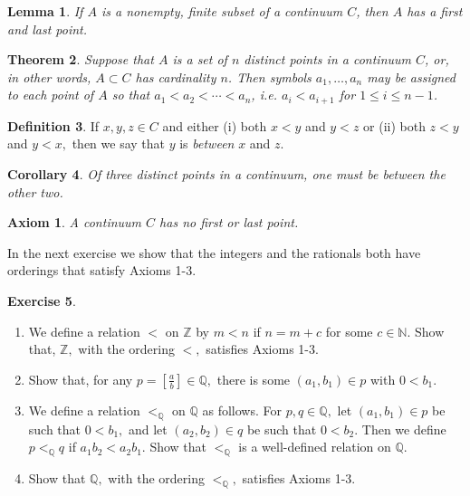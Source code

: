 \documentclass[11pt]{article}
\newcommand{\bbN}{\mathbb{N}}
\newcommand{\bbQ}{\mathbb{Q}}
\newcommand{\bbZ}{\mathbb{Z}}
\renewcommand{\_}[1]{\underline{ #1 }}
\newtheorem{theorem}{Theorem}[section]
\newtheorem{lemma}[theorem]{Lemma}
\newtheorem{corollary}[theorem]{Corollary}
\newtheorem{axiom}{Axiom}
\theoremstyle{definition}
\newtheorem{definition}[theorem]{Definition}
\newtheorem{exercise}[theorem]{Exercise}
\numberwithin{equation}{subsection}
\begin{document}
\begin{lemma}  If $A$ is a nonempty, finite subset of a continuum $C$, then $A$ has a first and last point.
\end{lemma}

\begin{theorem}  Suppose that $A$ is a set of $n$ distinct points in a continuum $C$, or, in other words, $A \subset C$ has cardinality $n$.  Then symbols $a_1, \dotsc, a_n$ may be assigned to each point of $A$ so that $a_1 < a_2 < \dotsm < a_n$, i.e. $a_i < a_{i + 1}$ for $1 \leq i \leq n - 1$.
\end{theorem}

\begin{definition}  If $x, y, z \in C$ and either (i) both $x < y$ and $y < z$ or (ii) both $z<y$ and $y<x,$ then we say that $y$ is \emph{between} $x$ and $z$.
\end{definition}

\begin{corollary}  Of three distinct points in a continuum, one must be between the other two.
\end{corollary}

\begin{axiom} A continuum $C$ has no first or last point.
\end{axiom}


In the next exercise we show that the integers and the rationals both have orderings that satisfy Axioms 1-3.

\begin{exercise}
\begin{enumerate}
\item[a)]  We define a relation $<$ on $\bbZ$ by $m<n$ if $n=m+c$ for some $c\in \bbN.$  Show that,
$\bbZ,$ with the ordering $<,$ satisfies Axioms 1-3. 

\item[b)] Show that, for any $p=\left[\frac{a}{b}\right]\in\bbQ,$ there is some $(a_1,b_1)\in p$ with $0<b_1.$

\item[c)] We define a relation $<_{\bbQ}$ on $\bbQ$ as follows. 
For $p,q\in\bbQ,$ let $(a_1,b_1)\in p$ be such that $0<b_1,$ and let $(a_2,b_2)\in q$ be such that $0<b_2.$  Then we define $p<_{\bbQ} q$ if $a_1b_2<a_2 b_1.$ 
Show that $<_{\bbQ}$ is a well-defined relation on $\bbQ.$
\item[d)] Show that $\bbQ,$ with the ordering $<_{\bbQ},$ satisfies Axioms 1-3.

\end{enumerate}
\end{exercise}
\end{document}
